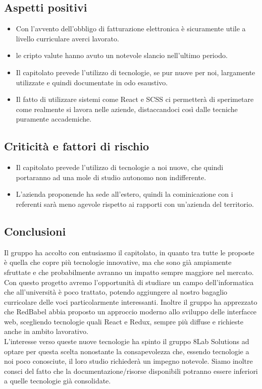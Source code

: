 \subsection{Aspetti positivi}
\begin{itemize}
	\item Con l'avvento dell'obbligo di fatturazione elettronica è sicuramente
	utile a livello curriculare averci lavorato.
	\item le cripto valute hanno avuto un notevole slancio nell'ultimo periodo.
	\item Il capitolato prevede l'utilizzo di tecnologie, se pur nuove per noi,
	largamente utilizzate e quindi documentate in odo esaustivo.
	\item Il fatto di utilizzare sistemi come React e SCSS ci permetterà di
	sperimetare come realmente si lavora nelle aziende, distaccandoci così dalle
	tecniche puramente accademiche.
\end{itemize}

\subsection{Criticità e fattori di rischio}
\begin{itemize}
	\item Il capitolato prevede l'utilizzo di tecnologie a noi nuove, che quindi 
portaranno ad una mole di studio autonomo non indifferente.
	\item L'azienda proponende ha sede all'estero, quindi la cominicazione con i 
referenti sarà meno agevole rispetto ai rapporti con un'azienda del territorio.
\end{itemize}

\subsection{Conclusioni} Il gruppo ha accolto con entusiasmo il capitolato, in 
quanto tra tutte le proposte è quella che copre più tecnologie innovative, ma 
che sono già ampiamente sfruttate e che probabilmente avranno un impatto sempre 
maggiore nel mercato. Con questo progetto avremo l'opportunità di studiare un 
campo dell'informatica che all'università è poco trattato, potendo aggiungere al 
nostro bagaglio curricolare delle voci particolarmente interessanti. Inoltre il 
gruppo ha apprezzato che RedBabel abbia proposto un approccio moderno allo 
sviluppo delle interfacce web, scegliendo tecnologie quali React e Redux, sempre 
più diffuse e richieste anche in ambito lavorativo.\\
 L'interesse verso queste nuove tecnologie ha spinto il gruppo 8Lab Solutions ad 
optare per questa scelta nonostante la consapevolezza che, essendo tecnologie a 
noi poco conosciute, il loro studio richiederà un impegno notevole. Siamo 
inoltre consci del fatto che la documentazione/risorse disponibili potranno 
essere inferiori a quelle tecnologie già consolidate.
